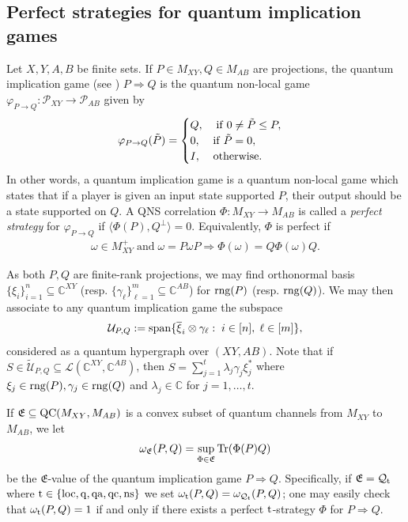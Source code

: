 \documentclass[11pt]{amsart}
\newcommand{\cl}[1]{\mathcal{#1}}
\newcommand{\bb}[1]{\mathbb{#1}}
\begin{document}
\subsection{Perfect strategies for quantum implication games}

Let $X, Y, A, B$ be finite sets. If $P \in M_{XY}, Q \in M_{AB}$ are projections, the quantum implication game (see \cite{tt}) $P \Rightarrow Q$ is the quantum non-local game $\varphi_{P\rightarrow Q}: \cl{P}_{XY}\rightarrow \cl{P}_{AB}$ given by
\begin{gather*}
	\varphi_{P\rightarrow Q}(\tilde{P}) = \begin{cases}
	Q, \;\;\;\; {\rm if\;} 0 \neq \tilde{P} \leq P,
\\	0, \;\;\;\; {\rm if\;} \tilde{P} = 0,
\\	I, \;\;\;\; {\rm otherwise.}
\end{cases}
\end{gather*}
\noindent In other words, a quantum implication game is a quantum non-local game which states that if a player is given an input state supported $P$, their output should be a state supported on $Q$. A QNS correlation $\Phi: M_{XY}\rightarrow M_{AB}$ is called a \textit{perfect strategy} for $\varphi_{P\rightarrow Q}$ if $\langle \Phi(P), Q^{\perp} \rangle = 0$. Equivalently, $\Phi$ is perfect if
\begin{gather*}
	\omega \in M_{XY}^{+} \; \text{and} \; \omega = P\omega P \Rightarrow \Phi(\omega) = Q\Phi(\omega)Q.
\end{gather*}


As both $P, Q$ are finite-rank projections, we may find orthonormal basis $\{\xi_{i}\}_{i=1}^{n} \subseteq \bb{C}^{XY}$ (resp. $\{\gamma_{\ell}\}_{\ell=1}^{m} \subseteq \bb{C}^{AB}$) for ${\rm rng}(P)$ (resp. ${\rm rng}(Q)$). We may then associate to any quantum implication game the subspace
\begin{gather*}
	\cl{U}_{P, Q} := {\rm span}\{\overline{\xi}_{i}\otimes \gamma_{\ell}: \; i \in [n], \; \ell \in [m]\},
\end{gather*}
\noindent considered as a quantum hypergraph over $(XY, AB)$. Note that if $S \in \tilde{\cl{U}}_{P, Q} \subseteq \cl{L}(\bb{C}^{XY}, \bb{C}^{AB})$, then $S = \sum_{j=1}^{t}\lambda_{j}\gamma_{j}\xi_{j}^{*}$ where $\xi_{j} \in {\rm rng}(P), \gamma_{j} \in {\rm rng}(Q)$ and $\lambda_{j} \in \bb{C}$ for $j = 1, \hdots, t$. 

If $\mathfrak{E} \subseteq {\rm QC}(M_{XY}, M_{AB})$ is a convex subset of quantum channels from $M_{XY}$ to $M_{AB}$, we let
\begin{gather}\label{imp_value}
	\omega_{\mathfrak{E}}(P, Q) = \sup\limits_{\Phi \in \mathfrak{E}}{\rm Tr}(\Phi(P)Q)
\end{gather}
\noindent be the $\mathfrak{E}$-value of the quantum implication game $P\Rightarrow Q$. Specifically, if $\mathfrak{E} = \cl{Q}_{\rm t}$ where ${\rm t} \in \{\rm loc, q, qa, qc, ns\}$ we set $\omega_{\rm t}(P, Q) = \omega_{\cl{Q}_{\rm t}}(P, Q)$; one may easily check that $\omega_{\rm t}(P, Q) = 1$ if and only if there exists a perfect ${\rm t}$-strategy $\Phi$ for $P\Rightarrow Q$. 
\end{document}
